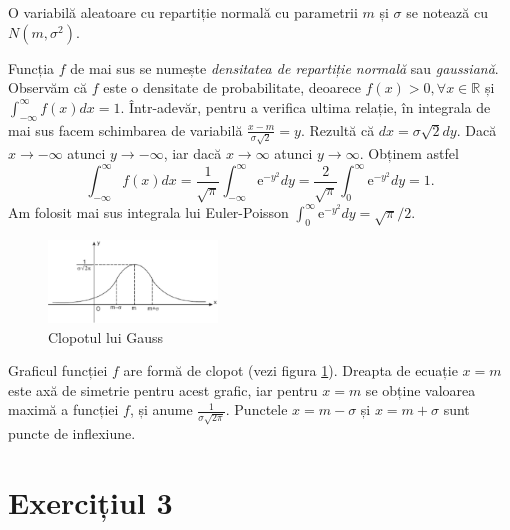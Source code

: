 \documentclass[9pt,a4paper]{article}
\begin{document}
O variabilă aleatoare cu repartiție normală cu parametrii $m$ și $\sigma$ se notează cu $N(m,\sigma^2)$.

Funcția $f$ de mai sus se numește \textit{densitatea de repartiție normală} sau \textit{gaussiană}. Observăm că $f$ este o densitate de probabilitate, deoarece $f(x) > 0, \forall x \in \mathbb{R}$ și $\int_{-\infty}^{\infty} f(x)dx = 1$. Într-adevăr, pentru a verifica ultima relație, în integrala de mai sus facem schimbarea de variabilă $\frac{x-m}{\sigma\sqrt{2}}=y$. Rezultă că $dx = \sigma\sqrt{2} dy$. Dacă $x \rightarrow -\infty$ atunci $y \rightarrow -\infty$, iar dacă $x \rightarrow \infty$ atunci $y \rightarrow \infty$. Obținem astfel
$$\int_{-\infty}^{\infty}f(x)dx = \frac{1}{\sqrt{\pi}}\int_{-\infty}^{\infty}\mathrm{e}^{-y^2}dy = \frac{2}{\sqrt{\pi}}\int_0^{\infty}\mathrm{e}^{-y^2}dy = 1.$$
Am folosit mai sus integrala lui Euler-Poisson $\int_0^\infty \mathrm{e}^{-y^2} dy = \sqrt{\pi}/2$.

\begin{figure}
    \includegraphics[width=0.4\textwidth]{func_plot.png}
    \caption{Clopotul lui Gauss}
    \label{fig:gauss}
\end{figure}


Graficul funcției $f$ are formă de clopot (vezi figura \ref{fig:gauss}). Dreapta de ecuație $x = m$ este axă de simetrie pentru acest grafic, iar pentru $x = m$ se obține valoarea maximă a funcției $f$, și anume $\frac{1}{\sigma\sqrt{2\pi}}$. Punctele $x = m - \sigma$ și $x = m + \sigma$ sunt puncte de inflexiune.

\section*{Exercițiul 3}
\end{document}
